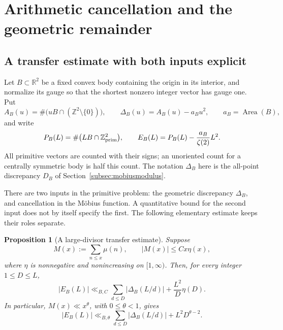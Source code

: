\documentclass[11pt,a4paper]{article}
\numberwithin{equation}{section}
\newtheorem{proposition}[theorem]{Proposition}
\theoremstyle{definition}
\theoremstyle{remark}
\begin{document}
\section{Arithmetic cancellation and the geometric remainder}
\label{sec:arithmeticgeometry}

\subsection{A transfer estimate with both inputs explicit}
\label{subsec:primitiveRHtransfer}

Let $B\subset\mathbb R^2$ be a fixed convex body containing the origin in
its interior, and normalize its gauge so that the shortest nonzero
integer vector has gauge one.  Put
\[
 A_B(u)=\#\bigl(uB\cap(\mathbb Z^2\setminus\{0\})\bigr),\qquad
 \Delta_B(u)=A_B(u)-a_Bu^2,\qquad a_B=\operatorname{Area}(B),
\]
and write
\[
 P_B(L)=\#\bigl(LB\cap\mathbb Z^2_{\rm prim}\bigr),\qquad
 E_B(L)=P_B(L)-\frac{a_B}{\zeta(2)}L^2.
\]
All primitive vectors are counted with their signs; an unoriented count
for a centrally symmetric body is half this count.
The notation $\Delta_B$ here is the all-point discrepancy $D_B$ of
Section~\ref{subsec:mobiusmodulus}.

There are two inputs in the primitive problem: the geometric discrepancy
$\Delta_B$, and cancellation in the M\"obius function.  A quantitative
bound for the second input does not by itself specify the first.  The
following elementary estimate keeps their roles separate.

\begin{proposition}[A large-divisor transfer estimate]
\label{prop:primitiveRHtransfer}
Suppose
\[
 M(x):=\sum_{n\le x}\mu(n),\qquad |M(x)|\le Cx\eta(x),
\]
where $\eta$ is nonnegative and nonincreasing on $[1,\infty)$.
Then, for every integer $1\le D\le L$,
\begin{equation}\label{eq:primitiveRHmaster}
 |E_B(L)|\ll_{B,C}
       \sum_{d\le D}|\Delta_B(L/d)|
       +\frac{L^2}{D}\eta(D).
\end{equation}
In particular, $M(x)\ll x^\theta$, with $0\le\theta<1$, gives
\begin{equation}\label{eq:primitiveRHpowerM}
 |E_B(L)|\ll_{B,\theta}
       \sum_{d\le D}|\Delta_B(L/d)|+L^2D^{\theta-2}.
\end{equation}
\end{proposition}
\end{document}
